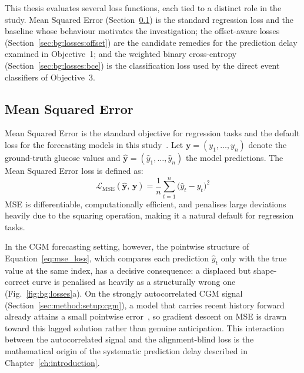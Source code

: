 This thesis evaluates several loss functions, each tied to a distinct role in the study. Mean Squared Error (Section~\ref{sec:bg:losses:mse}) is the standard regression loss and the baseline whose behaviour motivates the investigation; the offset-aware losses (Section~\ref{sec:bg:losses:offset}) are the candidate remedies for the prediction delay examined in Objective~1; and the weighted binary cross-entropy (Section~\ref{sec:bg:losses:bce}) is the classification loss used by the direct event classifiers of Objective~3.

\subsection{Mean Squared Error} \label{sec:bg:losses:mse}

Mean Squared Error is the standard objective for regression tasks and the default loss for the forecasting models in this study~\citep{goodfellow2016deeplearning}. Let $\mathbf{y} = (y_1, \ldots, y_n)$ denote the ground-truth glucose values and $\hat{\mathbf{y}} = (\hat{y}_1, \ldots, \hat{y}_n)$ the model predictions. The Mean Squared Error loss is defined as:
\begin{equation}
    \mathcal{L}_\text{MSE}(\hat{\mathbf{y}},\, \mathbf{y}) = \frac{1}{n}\sum_{t=1}^{n}\bigl(\hat{y}_t - y_t\bigr)^2
    \label{eq:mse_loss}
\end{equation}
MSE is differentiable, computationally efficient, and penalises large deviations heavily due to the squaring operation, making it a natural default for regression tasks.

In the CGM forecasting setting, however, the pointwise structure of Equation~\ref{eq:mse_loss}, which compares each prediction $\hat{y}_t$ only with the true value at the same index, has a decisive consequence: a displaced but shape-correct curve is penalised as heavily as a structurally wrong one (Fig.~\ref{fig:bg:losses}a). On the strongly autocorrelated CGM signal (Section~\ref{sec:method:setup:cgm}), a model that carries recent history forward already attains a small pointwise error~\citep{wolff2025cgpm}, so gradient descent on MSE is drawn toward this lagged solution rather than genuine anticipation. This interaction between the autocorrelated signal and the alignment-blind loss is the mathematical origin of the systematic prediction delay described in Chapter~\ref{ch:introduction}.

